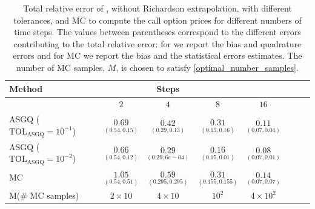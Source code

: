 \FloatBarrier

\begin{table}[h!]
	\centering
	\begin{tabular}{l*{6}{c}r}
	\toprule[1.5pt]
	Method & & Steps  & &     \\
	\hline
		    & $2$ & $4$ & $8$  & $16$  \\
		\hline

		ASGQ ($\text{TOL}_{\text{ASGQ}}=10^{-1}$)  & $\underset{(0.54,0.15)}{\mathbf{
			0.69}}$& $ \underset{(0.29,0.13)}{\mathbf{    
			0.42}}$ & $ \underset{(0.15,0.16)}{\mathbf{     
			0.31
		}}$   & $ \underset{(0.07,0.04)}{\mathbf{     
			0.11
		}}$ \\

		ASGQ ($\text{TOL}_{\text{ASGQ}}=10^{-2}$)  & $\underset{(0.54,0.12)}{\mathbf{ 
			0.66}}$ & $ \underset{(0.29,6e-04)}{\mathbf{  0.29}}$ & $\underset{(0.15,0.01)}{\mathbf{    0.16}}$&  $ \underset{(0.07,0.01)}{\mathbf{0.08}}$  \\
				\hline
				MC    & $\underset{(0.54,0.51)}{\mathbf{1.05}}$  & $\underset{(0.295,0.295)}{\mathbf{0.59}}$  &$\underset{(0.155,0.155)}{
				\mathbf{0.31}}$& $\underset{(0.07,0.07)}{
				\mathbf{0.14}}$ \\	
		M(\# MC samples)   & $2 \times 10$  & $4 \times 10$  &$10^2$  & $4 \times 10^2$ \\
		\bottomrule[1.25pt]
	\end{tabular}
	\caption{Total relative error of , without Richardson extrapolation, with different tolerances, and MC to compute the call option prices for different numbers of time steps. The values between parentheses correspond to the different errors contributing to the total relative error: for  we report the bias and quadrature errors and for MC we report the bias and the statistical errors estimates. The number of MC samples, $M$, is chosen to satisfy \eqref{optimal_number_samples}.}
	\label{Total error of MISC and MC to compute Call option price of the different tolerances for different number of time steps. Case $K=1$, $H=0.07$, without Richardson extrapolation. The numbers between parentheses are the corresponding absolute errors,linear}
\end{table}
\FloatBarrier




